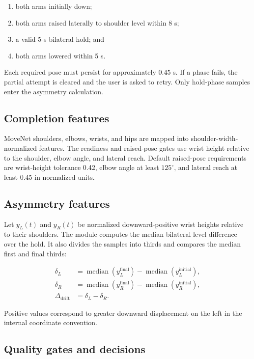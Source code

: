 \documentclass[11pt,a4paper]{article}
\begin{document}
\begin{enumerate}
  \item both arms initially down;
  \item both arms raised laterally to shoulder level within 8 s;
  \item a valid 5-s bilateral hold; and
  \item both arms lowered within 5 s.
\end{enumerate}

Each required pose must persist for approximately 0.45 s. If a phase fails, the partial attempt is cleared and the user is asked to retry. Only hold-phase samples enter the asymmetry calculation.

\subsection{Completion features}

MoveNet shoulders, elbows, wrists, and hips are mapped into shoulder-width-normalized features. The readiness and raised-pose gates use wrist height relative to the shoulder, elbow angle, and lateral reach. Default raised-pose requirements are wrist-height tolerance 0.42, elbow angle at least $125^{\circ}$, and lateral reach at least 0.45 in normalized units.

\subsection{Asymmetry features}

Let $y_L(t)$ and $y_R(t)$ be normalized downward-positive wrist heights relative to their shoulders. The module computes the median bilateral level difference over the hold. It also divides the samples into thirds and compares the median first and final thirds:

\begin{align}
\delta_L &= \operatorname{median}(y_L^{\mathrm{final}})-\operatorname{median}(y_L^{\mathrm{initial}}),\\
\delta_R &= \operatorname{median}(y_R^{\mathrm{final}})-\operatorname{median}(y_R^{\mathrm{initial}}),\\
\Delta_{\mathrm{drift}} &= \delta_L-\delta_R.
\end{align}

Positive values correspond to greater downward displacement on the left in the internal coordinate convention.

\subsection{Quality gates and decisions}
\end{document}

